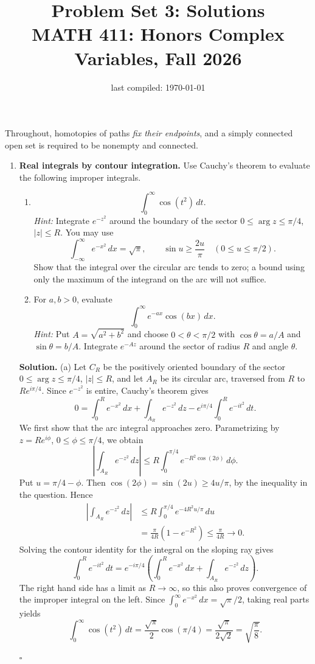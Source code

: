 \documentclass[12pt,reqno]{amsart}
\title{Problem Set 3: Solutions \\ MATH 411: Honors Complex Variables, Fall 2026}
\date{last compiled: \today}
\newenvironment{solution}
  {\par\smallskip\begin{tcolorbox}[breakable,enhanced,colback=solblue,colframe=solframe,
   boxrule=0.5pt,arc=2pt,left=6pt,right=6pt,top=4pt,bottom=4pt]\noindent\textbf{Solution.}}
  {\hfill$\square$\end{tcolorbox}\par\medskip}
\begin{document}
\maketitle

Throughout, homotopies of paths \emph{fix their endpoints}, and a simply connected open set is required to be nonempty and connected.

\begin{enumerate}
\item \textbf{Real integrals by contour integration.}
Use Cauchy's theorem to evaluate the following improper integrals.
\begin{enumerate}
\item
\[
 \int_0^\infty \cos(t^2)\,dt.
\]
\emph{Hint:} Integrate $e^{-z^2}$ around the boundary of the sector
$0\leq\arg z\leq\pi/4$, $|z|\leq R$.
You may use
\[
 \int_{-\infty}^{\infty}e^{-x^2}\,dx=\sqrt{\pi},\qquad
 \sin u\geq\frac{2u}{\pi}\quad(0\leq u\leq\pi/2).
\]
Show that the integral over the circular arc tends to zero; a bound
using only the maximum of the integrand on the arc will not suffice.
\item For $a,b>0$, evaluate
\[
 \int_0^\infty e^{-ax}\cos(bx)\,dx.
\]
\emph{Hint:} Put $A=\sqrt{a^2+b^2}$ and choose
$0<\theta<\pi/2$ with $\cos\theta=a/A$ and $\sin\theta=b/A$.
Integrate $e^{-Az}$ around the sector of radius $R$ and angle $\theta$.
\end{enumerate}

\begin{solution}
\noindent (a) Let $C_R$ be the positively oriented boundary of the sector
$0\leq\arg z\leq\pi/4$, $|z|\leq R$, and let $A_R$ be its circular
arc, traversed from $R$ to $Re^{i\pi/4}$. Since $e^{-z^2}$ is entire,
Cauchy's theorem gives
\[
0=\int_0^R e^{-x^2}\,dx+\int_{A_R}e^{-z^2}\,dz
  -e^{i\pi/4}\int_0^R e^{-it^2}\,dt.
\]
We first show that the arc integral approaches zero. Parametrizing by
$z=Re^{i\phi}$, $0\leq\phi\leq\pi/4$, we obtain
\[
\left|\int_{A_R}e^{-z^2}\,dz\right|
 \leq R\int_0^{\pi/4}e^{-R^2\cos(2\phi)}\,d\phi.
\]
Put $u=\pi/4-\phi$. Then $\cos(2\phi)=\sin(2u)\geq4u/\pi$, by the
inequality in the question. Hence
\begin{align*}
\left|\int_{A_R}e^{-z^2}\,dz\right|
 &\leq R\int_0^{\pi/4}e^{-4R^2u/\pi}\,du\\
 &=\frac{\pi}{4R}(1-e^{-R^2})\leq\frac{\pi}{4R}\longrightarrow0.
\end{align*}
Solving the contour identity for the integral on the sloping ray gives
\[
\int_0^R e^{-it^2}\,dt
 =e^{-i\pi/4}\left(\int_0^R e^{-x^2}\,dx
                  +\int_{A_R}e^{-z^2}\,dz\right).
\]
The right hand side has a limit as $R\to\infty$, so this also proves
convergence of the improper integral on the left. Since
$\int_0^\infty e^{-x^2}\,dx=\sqrt{\pi}/2$, taking real parts yields
\[
\boxed{\displaystyle\int_0^\infty\cos(t^2)\,dt
 =\frac{\sqrt{\pi}}{2}\cos(\pi/4)
 =\frac{\sqrt{\pi}}{2\sqrt2}=\sqrt{\frac{\pi}{8}}.}
\]


\end{solution}
\end{enumerate}
\end{document}
